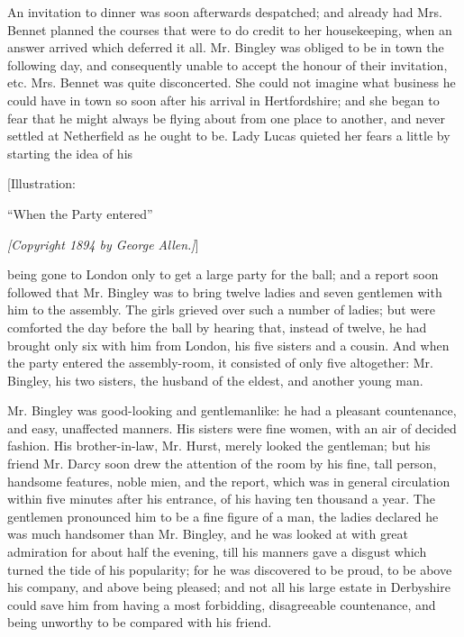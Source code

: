 \documentclass[12pt]{book}
\begin{document}
An invitation to dinner was soon afterwards despatched; and already had Mrs. Bennet planned the courses that were to do credit to her housekeeping, when an answer arrived which deferred it all. Mr. Bingley was obliged to be in town the following day, and consequently unable to accept the honour of their invitation, etc. Mrs. Bennet was quite disconcerted. She could not imagine what business he could have in town so soon after his arrival in Hertfordshire; and she began to fear that he might always be flying about from one place to another, and never settled at Netherfield as he ought to be. Lady Lucas quieted her fears a little by starting the idea of his

[Illustration:

``When the Party entered''

\emph{[\textit{Copyright 1894 by George Allen.}]}]

being gone to London only to get a large party for the ball; and a report soon followed that Mr. Bingley was to bring twelve ladies and seven gentlemen with him to the assembly. The girls grieved over such a number of ladies; but were comforted the day before the ball by hearing that, instead of twelve, he had brought only six with him from London, his five sisters and a cousin. And when the party entered the assembly-room, it consisted of only five altogether: Mr. Bingley, his two sisters, the husband of the eldest, and another young man.

Mr. Bingley was good-looking and gentlemanlike: he had a pleasant countenance, and easy, unaffected manners. His sisters were fine women, with an air of decided fashion. His brother-in-law, Mr. Hurst, merely looked the gentleman; but his friend Mr. Darcy soon drew the attention of the room by his fine, tall person, handsome features, noble mien, and the report, which was in general circulation within five minutes after his entrance, of his having ten thousand a year. The gentlemen pronounced him to be a fine figure of a man, the ladies declared he was much handsomer than Mr. Bingley, and he was looked at with great admiration for about half the evening, till his manners gave a disgust which turned the tide of his popularity; for he was discovered to be proud, to be above his company, and above being pleased; and not all his large estate in Derbyshire could save him from having a most forbidding, disagreeable countenance, and being unworthy to be compared with his friend.
\end{document}
